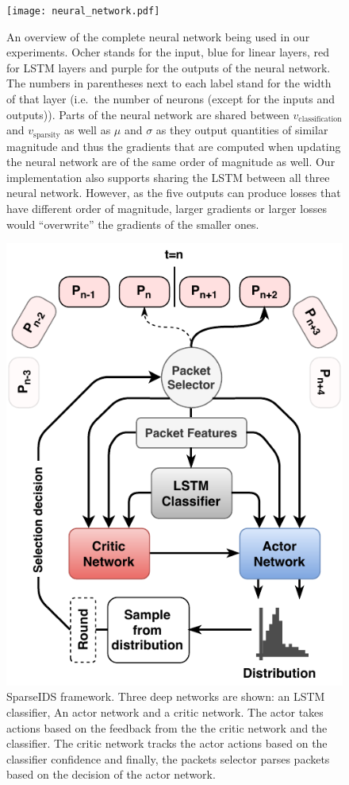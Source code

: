 \documentclass[conference]{IEEEtran}
\newcommand\note[2]{{\color{#1}#2}}
\begin{document}
\begin{figure}
\centering
  \texttt{[image: neural\_network.pdf]}
  \caption{An overview of the complete neural network being used in our experiments. Ocher stands for the input, blue for linear layers, red for LSTM layers and purple for the outputs of the neural network. The numbers in parentheses next to each label stand for the width of that layer (i.e.~the number of neurons (except for the inputs and outputs)). Parts of the neural network are shared between $v_\text{classification}$ and $v_\text{sparsity}$ as well as $\mu$ and $\sigma$ as they output quantities of similar magnitude and thus the gradients that are computed when updating the neural network are of the same order of magnitude as well. Our implementation also supports sharing the LSTM between all three neural network. However, as the five outputs can produce losses that have different order of magnitude, larger gradients or larger losses would ``overwrite'' the gradients of the smaller ones.}
  \label{fig:neuralNetworkArchitecture}
\end{figure}


\begin{figure}
\centering
  \includegraphics[width=0.8\columnwidth]{img/rnn-sampling.pdf}
  \caption{SparseIDS framework. Three deep networks are shown: an LSTM classifier, An actor network and a critic network. The actor takes actions based on the feedback from the the critic network and the classifier. The critic network tracks the actor actions based on the classifier confidence and finally, the packets selector parses packets based on the decision of the actor network.}
  \label{fig:sampling}
\end{figure}
\end{document}
